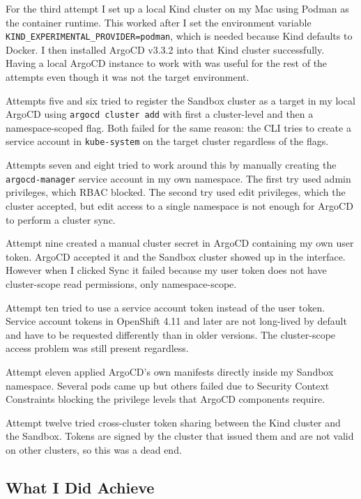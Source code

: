 For the third attempt I set up a local Kind cluster on my Mac using Podman as the
container runtime. This worked after I set the environment variable
\texttt{KIND\_EXPERIMENTAL\_PROVIDER=podman}, which is needed because Kind defaults to
Docker. I then installed ArgoCD v3.3.2 into that Kind cluster successfully. Having a
local ArgoCD instance to work with was useful for the rest of the attempts even though
it was not the target environment.

Attempts five and six tried to register the Sandbox cluster as a target in my local
ArgoCD using \texttt{argocd cluster add} with first a cluster-level and then a
namespace-scoped flag. Both failed for the same reason: the CLI tries to create a
service account in \texttt{kube-system} on the target cluster regardless of the flags.

Attempts seven and eight tried to work around this by manually creating the
\texttt{argocd-manager} service account in my own namespace. The first try used admin
privileges, which RBAC blocked. The second try used edit privileges, which the cluster
accepted, but edit access to a single namespace is not enough for ArgoCD to perform a
cluster sync.

Attempt nine created a manual cluster secret in ArgoCD containing my own user token.
ArgoCD accepted it and the Sandbox cluster showed up in the interface. However when I
clicked Sync it failed because my user token does not have cluster-scope read
permissions, only namespace-scope.

Attempt ten tried to use a service account token instead of the user token. Service
account tokens in OpenShift 4.11 and later are not long-lived by default and have to be
requested differently than in older versions. The cluster-scope access problem was still
present regardless.

Attempt eleven applied ArgoCD's own manifests directly inside my Sandbox namespace.
Several pods came up but others failed due to Security Context Constraints blocking the
privilege levels that ArgoCD components require.

Attempt twelve tried cross-cluster token sharing between the Kind cluster and the
Sandbox. Tokens are signed by the cluster that issued them and are not valid on other
clusters, so this was a dead end.

\subsection{What I Did Achieve}

